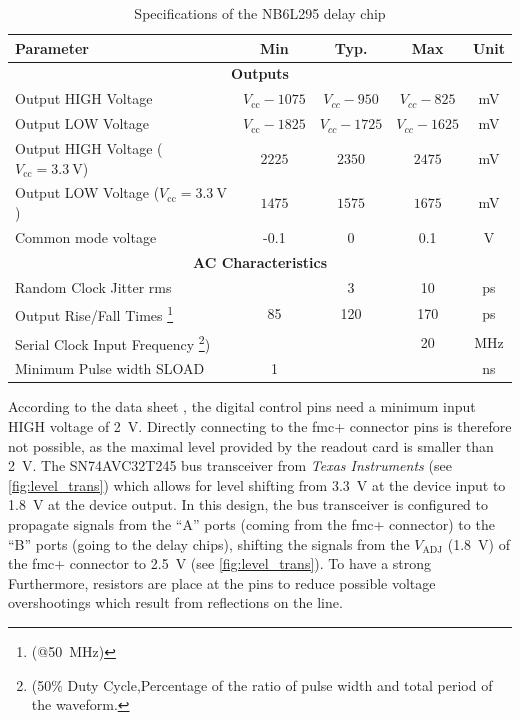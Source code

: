\begin{table}[tbh]
	\caption[NB6L295 Characteristics]{Specifications of the NB6L295 delay chip \cite{NB6L295}}
	\label{tab:nb6l295}
	\begin{minipage}{\textwidth}
		\centering
		\begin{tabularx}{\textwidth}{Xcccc}
			\toprule
			\textbf{Parameter} & \textbf{Min} & \textbf{Typ.} & \textbf{Max} & \textbf{Unit}\\
			\midrule
			\multicolumn{5}{c}{\textbf{Outputs}}  \\
			Output HIGH Voltage & $V_\text{cc} - 1075$ & $V_{cc} - 950$ & $V_{cc} - 825$ & mV\\
			Output LOW Voltage & $V_\text{cc} - 1825$ & $V_{cc} - 1725$ & $V_{cc} - 1625$ & mV\\
			Output HIGH Voltage ($V_\text{cc}=\SI{3.3}{\volt}$) & $2225$ & $2350$ & $2475$ & mV\\
			Output LOW Voltage ($V_\text{cc}=\SI{3.3}{\volt}$) & $1475$ & $1575$ & $1675$ & mV\\
			Common mode voltage & -0.1 & 0 & 0.1 & V\\[0.3cm]
			\multicolumn{5}{c}{\textbf{AC Characteristics}}  \\
			Random Clock Jitter \gls{rms}&  & 3 & 10 & ps\\
			Output Rise/Fall Times \footnote{(@\SI{50}{\mega \hertz})} & 85 & 120 & 170 & ps\\
			Serial Clock Input Frequency \footnote{(50\% Duty Cycle,Percentage of the ratio of pulse width and total period of the waveform.}) &  &  & 20 & MHz\\
			Minimum Pulse width SLOAD  & 1 &  &  & ns\\
			\bottomrule
		\end{tabularx}
	\end{minipage}
\end{table}
According to the data sheet \cite{NB6L295}, the digital control pins need a minimum input HIGH voltage of \SI{2}{\volt}.
Directly connecting to the \gls{fmc}+ connector pins is therefore not possible, as the maximal level provided by the readout card is smaller than \SI{2}{\volt}.
The SN74AVC32T245 bus transceiver from \textit{Texas Instruments} (see \autoref{fig:level_trans}) which allows for level shifting from \SI{3.3}{\volt} at the device input to \SI{1.8}{\volt} at the device output.
In this design, the bus transceiver is configured to propagate signals from the ``A'' ports (coming from the \gls{fmc}+ connector) to the ``B'' ports (going to the delay chips), shifting the signals from the $V_\text{ADJ}$ (\SI{1.8}{\volt}) of the \gls{fmc}+ connector to \SI{2.5}{\volt} (see \autoref{fig:level_trans}).
To have a strong 
Furthermore, resistors are place at the pins to reduce possible voltage overshootings which result from reflections on the line. 

